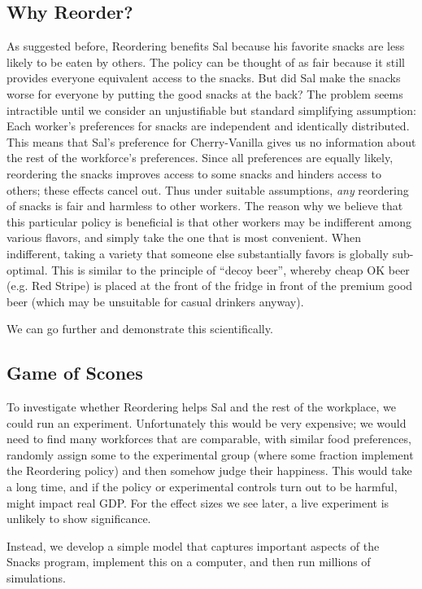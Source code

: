\documentclass[twocolumn]{article}
\begin{document}
\subsection{Why Reorder?}

As suggested before, Reordering benefits Sal because his favorite snacks are less likely to be eaten by others. The policy can be thought of as fair because it still provides everyone equivalent access to the snacks. But did Sal make the snacks worse for everyone by putting the good snacks at the back? The problem seems intractible until we consider an unjustifiable but standard simplifying assumption: Each worker's preferences for snacks are independent and identically distributed. This means that Sal's preference for Cherry-Vanilla gives us no information about the rest of the workforce's preferences. Since all preferences are equally likely, reordering the snacks improves access to some snacks and hinders access to others; these effects cancel out. Thus under suitable assumptions, {\it any} reordering of snacks is fair and harmless to other workers. The reason why we believe that this particular policy is beneficial is that other workers may be indifferent among various flavors, and simply take the one that is most convenient. When indifferent, taking a variety that someone else substantially favors is globally sub-optimal. This is similar to the principle of ``decoy beer'', whereby cheap OK beer (e.g. Red Stripe) is placed at the front of the fridge in front of the premium good beer (which may be unsuitable for casual drinkers anyway).

We can go further and demonstrate this scientifically.

\subsection{Game of Scones}

To investigate whether Reordering helps Sal and the rest of the workplace, we could run an experiment. Unfortunately this would be very expensive; we would need to find many workforces that are comparable, with similar food preferences, randomly assign some to the experimental group (where some fraction implement the Reordering policy) and then somehow judge their happiness. This would take a long time, and if the policy or experimental controls turn out to be harmful, might impact real GDP. For the effect sizes we see later, a live experiment is unlikely to show significance.

Instead, we develop a simple model that captures important aspects of the Snacks program, implement this on a computer, and then run millions of simulations.
\end{document}
